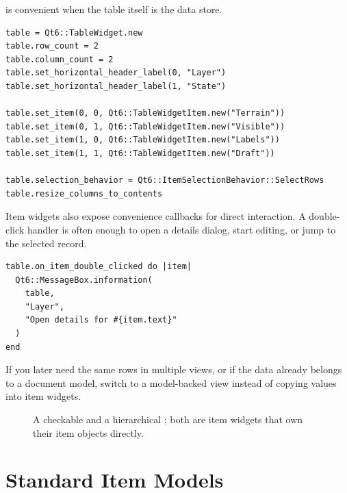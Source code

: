  is convenient when the table itself is the data store.

\begin{lstlisting}[style=crystal]
table = Qt6::TableWidget.new
table.row_count = 2
table.column_count = 2
table.set_horizontal_header_label(0, "Layer")
table.set_horizontal_header_label(1, "State")

table.set_item(0, 0, Qt6::TableWidgetItem.new("Terrain"))
table.set_item(0, 1, Qt6::TableWidgetItem.new("Visible"))
table.set_item(1, 0, Qt6::TableWidgetItem.new("Labels"))
table.set_item(1, 1, Qt6::TableWidgetItem.new("Draft"))

table.selection_behavior = Qt6::ItemSelectionBehavior::SelectRows
table.resize_columns_to_contents
\end{lstlisting}

Item widgets also expose convenience callbacks for direct interaction. A double-click handler is often enough to open a details dialog, start editing, or jump to the selected record.

\begin{lstlisting}[style=crystal]
table.on_item_double_clicked do |item|
  Qt6::MessageBox.information(
    table,
    "Layer",
    "Open details for #{item.text}"
  )
end
\end{lstlisting}

If you later need the same rows in multiple views, or if the data already belongs to a document model, switch to a model-backed view instead of copying values into item widgets.

\begin{figure}[htbp]
  \centering
  \begin{minipage}{0.48\textwidth}
    \centering
  \end{minipage}\hfill
  \begin{minipage}{0.48\textwidth}
    \centering
  \end{minipage}
  \caption{A checkable  and a hierarchical ; both are item widgets that own their item objects directly.}
\end{figure}

\section{Standard Item Models}

